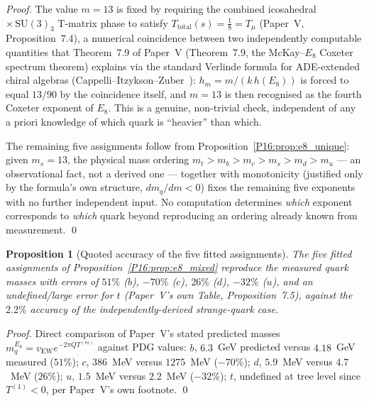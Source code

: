 \documentclass[11pt,a4paper]{article}
\newtheorem{proposition}[theorem]{Proposition}
\theoremstyle{definition}\newtheorem{definition}[theorem]{Definition}
\theoremstyle{remark}
\theoremstyle{definition}\newtheorem{construction}[theorem]{Construction}
\newcommand{\SU}{\mathrm{SU}}
\newcommand{\vEW}{v_{\mathrm{EW}}}
\begin{document}
\begin{proof}
The value $m=13$ is fixed by requiring the combined icosahedral
$\times\,\SU(3)_3$ T-matrix phase to satisfy $T_{\mathrm{total}}(s)=
\tfrac18=T_\mu$ (Paper~V, Proposition~7.4), a numerical coincidence
between two independently computable quantities that Theorem~7.9 of
Paper~V (Theorem~7.9, the McKay--$E_8$ Coxeter spectrum theorem) explains via the
standard Verlinde formula for ADE-extended chiral algebras
(Cappelli--Itzykson--Zuber~\cite{CIZ1987}): $h_m=m/(k\,h(E_8))$ is
forced to equal $13/90$ by the coincidence itself, and $m=13$ is then
recognised as the fourth Coxeter exponent of $E_8$. This is a genuine,
non-trivial check, independent of any a priori knowledge of which
quark is ``heavier'' than which.

The remaining five assignments follow from Proposition~\ref{P16:prop:e8_unique}:
given $m_s=13$, the physical mass ordering
$m_t>m_b>m_c>m_s>m_d>m_u$ --- an observational fact, not a derived
one --- together with monotonicity (justified only by the formula's
own structure, $dm_q/dm<0$) fixes the remaining five exponents with no
further independent input. No computation determines \emph{which}
exponent corresponds to \emph{which} quark beyond reproducing an
ordering already known from measurement.
\qed
\end{proof}

\begin{proposition}[Quoted accuracy of the five fitted assignments]
\label{P16:prop:e8_accuracy}
The five fitted assignments of Proposition~\ref{P16:prop:e8_mixed}
reproduce the measured quark masses with errors of $51\%$ ($b$),
$-70\%$ ($c$), $26\%$ ($d$), $-32\%$ ($u$), and an undefined/large
error for $t$ (Paper~V's own Table, Proposition~7.5), against the
$2.2\%$ accuracy of the independently-derived strange-quark case.
\end{proposition}

\begin{proof}
Direct comparison of Paper~V's stated predicted masses
$m_q^{E_8}=\vEW e^{-2\pi QT^{(m)}}$ against PDG values: $b$,
$6.3$~GeV predicted versus $4.18$~GeV measured ($51\%$); $c$,
$386$~MeV versus $1275$~MeV ($-70\%$); $d$, $5.9$~MeV versus
$4.7$~MeV ($26\%$); $u$, $1.5$~MeV versus $2.2$~MeV ($-32\%$); $t$,
undefined at tree level since $T^{(1)}<0$, per Paper~V's own footnote.
\qed
\end{proof}
\end{document}

